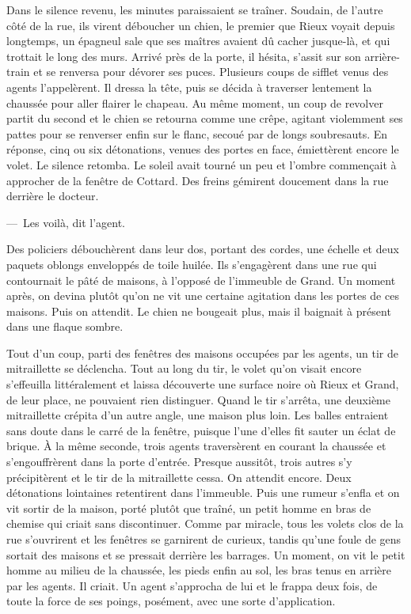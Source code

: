 \documentclass[french,twoside]{book} %
\begin{document}
Dans le silence revenu, les minutes paraissaient se traîner. Soudain, de l’autre côté de la rue, ils virent déboucher un chien, le premier que Rieux voyait depuis longtemps, un épagneul sale que ses maîtres avaient dû cacher jusque-là, et qui trottait le long des murs. Arrivé près de la porte, il hésita, s’assit sur son arrière-train et se renversa pour dévorer ses puces. Plusieurs coups de sifflet venus des agents l’appelèrent. Il dressa la tête, puis se décida à traverser lentement la chaussée pour aller flairer le chapeau. Au même moment, un coup de revolver partit du second et le chien se retourna comme une crêpe, agitant violemment ses pattes pour se renverser enfin sur le flanc, secoué par de longs soubresauts. En réponse, cinq ou six détonations, venues des portes en face, émiettèrent encore le volet. Le silence retomba. Le soleil avait tourné un peu et l’ombre commençait à approcher de la fenêtre de Cottard. Des freins gémirent doucement dans la rue derrière le docteur.\par
— Les voilà, dit l’agent.\par
Des policiers débouchèrent dans leur dos, portant des cordes, une échelle et deux paquets oblongs enveloppés de toile huilée. Ils s’engagèrent dans une rue qui contournait le pâté de maisons, à l’opposé de l’immeuble de Grand. Un moment après, on devina plutôt qu’on ne vit une certaine agitation dans les portes de ces maisons. Puis on attendit. Le chien ne bougeait plus, mais il baignait à présent dans une flaque sombre.\par
Tout d’un coup, parti des fenêtres des maisons occupées par les agents, un tir de mitraillette se déclencha. Tout au long du tir, le volet qu’on visait encore s’effeuilla littéralement et laissa découverte une surface noire où Rieux et Grand, de leur place, ne pouvaient rien distinguer. Quand le tir s’arrêta, une deuxième mitraillette crépita d’un autre angle, une maison plus loin. Les balles entraient sans doute dans le carré de la fenêtre, puisque l’une d’elles fit sauter un éclat de brique. À la même seconde, trois agents traversèrent en courant la chaussée et s’engouffrèrent dans la porte d’entrée. Presque aussitôt, trois autres s’y précipitèrent et le tir de la mitraillette cessa. On attendit encore. Deux détonations lointaines retentirent dans l’immeuble. Puis une rumeur s’enfla et on vit sortir de la maison, porté plutôt que traîné, un petit homme en bras de chemise qui criait sans discontinuer. Comme par miracle, tous les volets clos de la rue s’ouvrirent et les fenêtres se garnirent de curieux, tandis qu’une foule de gens sortait des maisons et se pressait derrière les barrages. Un moment, on vit le petit homme au milieu de la chaussée, les pieds enfin au sol, les bras tenus en arrière par les agents. Il criait. Un agent s’approcha de lui et le frappa deux fois, de toute la force de ses poings, posément, avec une sorte d’application.\par
\end{document}
